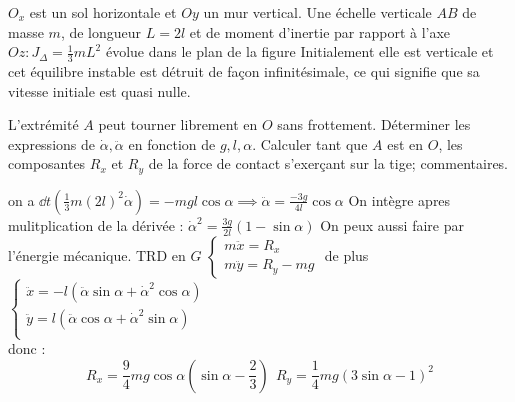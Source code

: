 \begin{Exercise}[title=Chute d'échelle]
  $O_x$ est un sol horizontale et $Oy$ un mur vertical. Une échelle verticale $AB$ de masse $m$, de longueur $L=2l$ et de moment d'inertie par rapport à l'axe $Oz: J_\Delta =\frac{1}{3}mL^2$ évolue dans le plan de la figure Initialement elle est verticale et cet équilibre instable est détruit de façon infinitésimale, ce qui signifie que sa vitesse initiale est quasi nulle.
  \begin{center}
  \end{center}
  
	L'extrémité $A$ peut tourner librement en $O$ sans frottement.
	\Question Déterminer les expressions de $\dot{\alpha},\ddot{\alpha}$ en fonction de $g,l,\alpha$.
	\Question Calculer tant que $A$ est en $O$, les composantes $R_x$ et $R_y$ de la force de contact s'exerçant sur la tige; commentaires.
\end{Exercise}
\begin{Answer}
	\Question on a $\dd{}{t}\left(\frac{1}{3}m(2l)^2\dot{\alpha}\right) = -mgl\cos \alpha \implies \boxed{\ddot{\alpha} = \frac{-3g}{4l}\cos\alpha}$
On intègre apres mulitplication de la dérivée : $\dot{\alpha}^2=\frac{3g}{2l}(1-\sin\alpha)$
On peux aussi faire par l'énergie mécanique.
	\Question TRD en $G$
	$ \begin{cases}
	m\ddot{x} =R_x \\
	m\ddot{y} =R_y-mg
	\end{cases} $ de plus $\begin{cases}
	\ddot{x} = -l(\ddot{\alpha}\sin\alpha +\dot{\alpha}^2\cos\alpha)\\
	\ddot{y} = l(\ddot{\alpha}\cos\alpha +\dot{\alpha}^2\sin\alpha)\\
	\end{cases}$ \\
	donc :
	\[ \boxed{R_x = \frac{9}{4}mg\cos\alpha\left(\sin\alpha -\frac{2}{3}\right)} ~ ~ \boxed{R_y= \frac{1}{4}mg\left(3\sin\alpha-1\right)^2} \]
\end{Answer}
